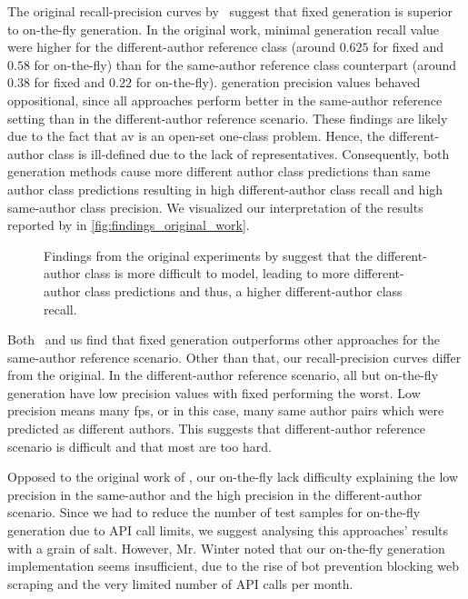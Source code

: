 The original recall-precision curves by \citet{koppel_determining_2014}\ suggest that fixed \imp{} generation is superior to on-the-fly \imp{} generation.
In the original work, minimal \imp{} generation recall value were higher for the different-author reference class (around $0.625$ for fixed and $0.58$ for on-the-fly) than for the same-author reference class counterpart (around $0.38$ for fixed and $0.22$ for on-the-fly).
\Imp{} generation precision values behaved oppositional, since all approaches perform better in the same-author reference setting than in the different-author reference scenario.
These findings are likely due to the fact that \ac{av} is an open-set one-class problem.
Hence, the different-author class is ill-defined due to the lack of representatives.
Consequently, both \imp{} generation methods cause more different author class predictions than same author class predictions resulting in high different-author class recall and high same-author class precision.
We visualized our interpretation of the results reported by \citet{koppel_determining_2014} in \autoref{fig:findings_original_work}.

\begin{figure}[htbp]
    \centering
    
    \caption[Results from the original \impAppr{} experiments.]{Findings from the original \impAppr{} experiments by \citet{koppel_determining_2014} suggest that the different-author class is more difficult to model, leading to more different-author class predictions and thus, a higher different-author class recall.}
    \label{fig:findings_original_work}
\end{figure}

Both \citet{koppel_determining_2014}\ and us find that fixed \imp{} generation outperforms other approaches for the same-author reference scenario.
Other than that, our recall-precision curves differ from the original.
In the different-author reference scenario, all but on-the-fly generation have low precision values with fixed \imps{} performing the worst. 
Low precision means many \acp{fp}, or in this case, many same author pairs which were predicted as different authors.
This suggests that different-author reference scenario is difficult and that most \imps{} are too hard. 

Opposed to the original work of \citet{koppel_determining_2014}, our on-the-fly \imps{} lack difficulty explaining the low precision in the same-author and the high precision in the different-author scenario.
Since we had to reduce the number of test samples for on-the-fly \imp{} generation due to API call limits, we suggest analysing this approaches' results with a grain of salt.
However, Mr. Winter noted that our on-the-fly \imp{} generation implementation seems insufficient, due to the rise of bot prevention blocking web scraping and the very limited number of API calls per month.

